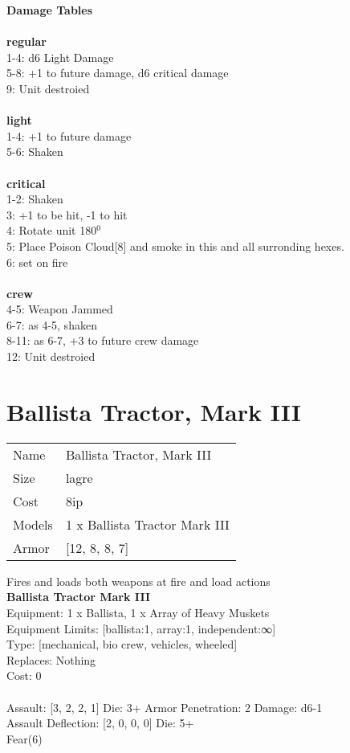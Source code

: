 {\bf Damage Tables} \\
\ \\ {\bf regular } \\
1-4: d6 Light Damage \\
5-8: +1 to future damage, d6 critical damage \\
9: Unit destroied \\
\ \\ {\bf light } \\
1-4: +1 to future damage \\
5-6: Shaken \\
\ \\ {\bf critical } \\
1-2: Shaken \\
3: +1 to be hit, -1 to hit \\
4: Rotate unit 180$^0$ \\
5: Place Poison Cloud[8] and smoke in this and all surronding hexes. \\
6: set on fire \\
\ \\ {\bf crew } \\
4-5: Weapon Jammed \\
6-7: as 4-5, shaken \\
8-11: as 6-7, +3 to future crew damage \\
12: Unit destroied \\










\pagebreak\pagebreak

\section{ Ballista Tractor, Mark III }

\begin{tabular}{ll}
  Name & Ballista Tractor, Mark III \\
  Size & lagre\\
  Cost & 8ip\\
  Models & 1 x Ballista Tractor Mark III\\
  Armor & [12, 8, 8, 7]\\
\end{tabular}

\noindent Fires and loads both weapons at fire and load actions\\ 


{\bf Ballista Tractor Mark III } \\
Equipment: 1 x Ballista, 1 x Array of Heavy Muskets \\
Equipment Limits: [ballista:1, array:1, independent:∞] \\
Type: [mechanical, bio crew, vehicles, wheeled] \\
Replaces: Nothing \\
Cost: 0\\
\ \\
Assault: [3, 2, 2, 1] Die: 3+ Armor Penetration: 2 Damage: d6-1 \\
Assault Deflection: [2, 0, 0, 0] Die: 5+\\
\indent Fear(6)\\ 
 
